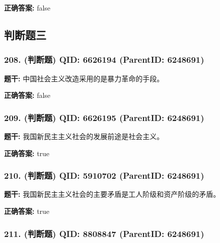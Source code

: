 \documentclass[12pt,UTF8]{ctexart}
\begin{document}
\textbf{正确答案:}
false

\vspace{0.3em}\hrulefill\vspace{0.7em}

\subsection*{判断题三}

\subsubsection*{208. (判断题) \small QID: 6626194 (ParentID: 6248691)}

\textbf{题干:}
中国社会主义改造采用的是暴力革命的手段。



\textbf{正确答案:}
false

\vspace{0.3em}\hrulefill\vspace{0.7em}

\subsubsection*{209. (判断题) \small QID: 6626195 (ParentID: 6248691)}

\textbf{题干:}
我国新民主主义社会的发展前途是社会主义。



\textbf{正确答案:}
true

\vspace{0.3em}\hrulefill\vspace{0.7em}

\subsubsection*{210. (判断题) \small QID: 5910702 (ParentID: 6248691)}

\textbf{题干:}
我国新民主主义社会的主要矛盾是工人阶级和资产阶级的矛盾。



\textbf{正确答案:}
true

\vspace{0.3em}\hrulefill\vspace{0.7em}

\subsubsection*{211. (判断题) \small QID: 8808847 (ParentID: 6248691)}
\end{document}
